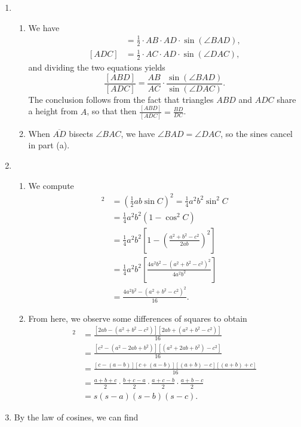 \begin{enumerate}
\item \begin{enumerate}
\item We have
\begin{align*}
[ABD] &= \frac{1}{2}\cdot AB\cdot AD\cdot\sin(\angle BAD), \\
[ADC] &= \frac{1}{2}\cdot AC\cdot AD\cdot\sin(\angle DAC),
\end{align*}
and dividing the two equations yields
\begin{equation*}
\frac{[ABD]}{[ADC]} = \frac{AB}{AC}\cdot\frac{\sin(\angle BAD)}{\sin(\angle DAC)}.
\end{equation*}
The conclusion follows from the fact that triangles $ABD$ and $ADC$ share a height from $A$, so that then $\frac{[ABD]}{[ADC]} = \frac{BD}{DC}$.
\item When $\overline{AD}$ bisects $\angle BAC$, we have $\angle BAD = \angle DAC$, so the sines cancel in part (a).
\end{enumerate}
\item \begin{enumerate}
\item We compute
\begin{align*}
[ABC]^2 &= \left(\frac{1}{2}ab\sin C\right)^2 = \frac{1}{4}a^2b^2\sin^2 C \\
&= \frac{1}{4}a^2b^2(1 - \cos^2 C) \\
&= \frac{1}{4}a^2b^2\left[1 - \left(\frac{a^2 + b^2 - c^2}{2ab}\right)^2\right] \\
&= \frac{1}{4}a^2b^2\left[\frac{4a^2b^2 - (a^2 + b^2 - c^2)^2}{4a^2b^2}\right] \\
&= \frac{4a^2b^2 - (a^2 + b^2 - c^2)^2}{16}.
\end{align*}
\item From here, we observe some differences of squares to obtain
\begin{align*}
[ABC]^2 &= \frac{[2ab - (a^2 + b^2 - c^2)][2ab + (a^2 + b^2 - c^2)]}{16} \\
&= \frac{[c^2 - (a^2 - 2ab + b^2)][(a^2 + 2ab + b^2) - c^2]}{16} \\
&= \frac{[c - (a - b)][c + (a - b)][(a + b) - c][(a + b) + c]}{16} \\
&= \frac{a + b + c}{2}\cdot\frac{b + c - a}{2}\cdot\frac{a + c - b}{2}\cdot\frac{a + b - c}{2} \\
&= s(s - a)(s - b)(s - c).
\end{align*}
\end{enumerate}
\item By the law of cosines, we can find

\end{enumerate}
